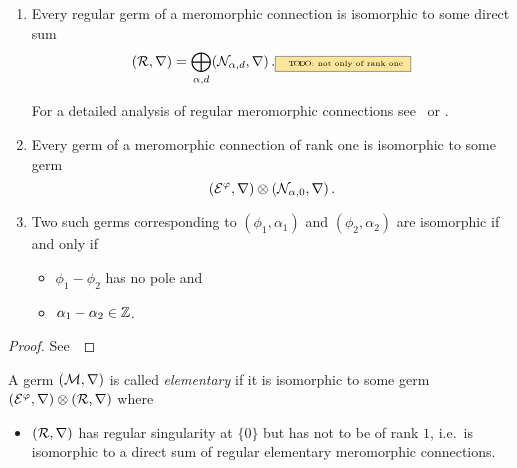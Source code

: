 \begin{prop}
  \begin{enumerate}
    \item
      Every regular germ of a meromorphic connection is isomorphic to some
      direct sum
      \[
        (\cR,\nabla)=\bigoplus_{\alpha,d}(\cN_{\alpha,d},\nabla)\,.
        \TODO[not only of rank one]
      \]
      \begin{s-rem}
        For a detailed analysis of regular meromorphic connections
        see~\cite[Sec.II.2]{sabbah2007isomonodromic} or
        \cite[Sec.5.2]{hotta2008}.
      \end{s-rem}
    \item Every germ of a meromorphic connection of rank one is isomorphic to
      some germ
      \[
        (\mathcal{E}^\varphi,\nabla)\otimes(\mathcal{N}_{\alpha,0},\nabla) \,.
      \]
    \item Two such germs corresponding to $(\phi_1,\alpha_1)$ and
      $(\phi_2,\alpha_2)$ are isomorphic if and only if
      \begin{itemize}
        \item $\phi_1-\phi_2$ has no pole and
        \item $\alpha_1-\alpha_2\in\mathbb{Z}$.
      \end{itemize}
  \end{enumerate}
\end{prop}
\begin{proof}
  See~\cite[Prop.II.5.1]{sabbah2007isomonodromic}
\end{proof}
\begin{defn}
  A germ $(\mathcal{M},\nabla)$ is called \emph{elementary} if it is isomorphic to
  some germ $(\mathcal{E}^\varphi,\nabla)\otimes(\mathcal{R},\nabla)$ where
  \begin{itemize}
    \item $(\mathcal{R},\nabla)$ has regular singularity at $\{0\}$ but has not to be
      of rank $1$, i.e.\ is isomorphic to a direct sum of regular elementary
      meromorphic connections.
  \end{itemize}
\end{defn}
